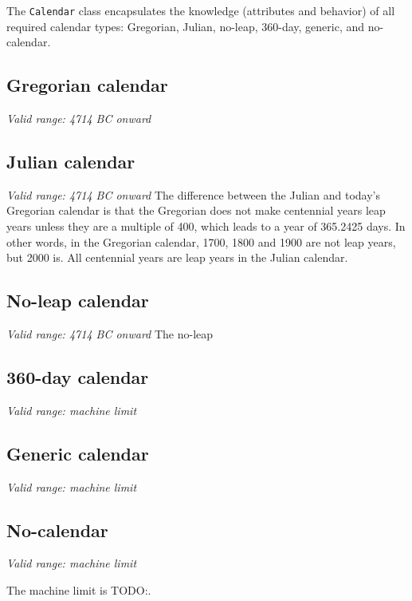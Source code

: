 
\label{sec:Calendar}
The {\tt Calendar} class encapsulates the knowledge (attributes and
behavior) of all required calendar types:  Gregorian, Julian, no-leap,
360-day, generic, and no-calendar.
            
\subsection{Gregorian calendar}
{\it Valid range: 4714 BC onward}

\subsection{Julian calendar} 
{\it Valid range: 4714 BC onward}
The difference between the Julian and today's Gregorian calendar is that 
the Gregorian does not make centennial years leap years unless they are 
a multiple of 400, which leads to a year of 365.2425 days. In other words, 
in the Gregorian calendar, 1700, 1800 and 1900 are not leap years, but 
2000 is. All centennial years are leap years in the Julian calendar. 

\subsection{No-leap calendar}
{\it Valid range: 4714 BC onward}
The no-leap 

\subsection{360-day calendar}
{\it Valid range: machine limit}

\subsection{Generic calendar}
{\it Valid range: machine limit}
 
\subsection{No-calendar}
{\it Valid range: machine limit}

The machine limit is TODO:.




